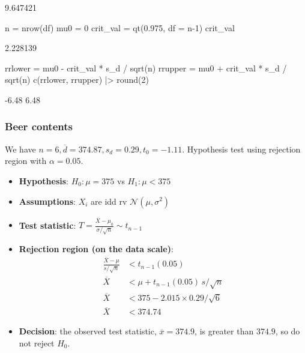 \documentclass[a4paper]{article}
\begin{document}
\begin{Schunk}
\begin{Soutput}
[1] 9.647421
\end{Soutput}
\begin{Sinput}
n = nrow(df)
mu0 = 0
crit_val = qt(0.975, df = n-1)
crit_val
\end{Sinput}
\begin{Soutput}
[1] 2.228139
\end{Soutput}
\begin{Sinput}
rrlower = mu0 - crit_val * s_d / sqrt(n)
rrupper = mu0 + crit_val * s_d / sqrt(n)
c(rrlower, rrupper) |> round(2)
\end{Sinput}
\begin{Soutput}
[1] -6.48  6.48
\end{Soutput}
\end{Schunk}
\subsubsection{Beer contents}
We have \( n = 6, \overline{d}=374.87, s_d = 0.29, t_0 = -1.11 \). Hypothesis test using rejection region with \( \alpha = 0.05 \).
\begin{itemize}
	\item \textbf{Hypothesis}: \( H_0: \mu = 375 \) vs \( H_1: \mu < 375 \)
	\item \textbf{Assumptions}: \( X_i \) are idd rv \( \mathcal{N}(\mu,\sigma^2) \)
	\item \textbf{Test statistic}: \( T = \frac{\overline{X}-\mu_0}{\sigma/\sqrt{n}} \sim t_{n-1} \)
	\item \textbf{Rejection region (on the data scale)}:
		\begin{align*}
		\frac{\overline{X} - \mu}{ s/\sqrt{n} } & < t_{n-1}(0.05)  \\
		\overline{X} & < \mu + t_{n-1}(0.05) \, s/\sqrt{n} \\
		\overline{X} & < 375 - 2.015 \times 0.29/\sqrt{6} \\
		\overline{X} & < 374.74
		\end{align*}
	\item \textbf{Decision}: the observed test statistic, \( \overline{x} = 374.9 \), is greater than \( 374.9 \), so do not reject \( H_0 \).
\end{itemize}
\end{document}
